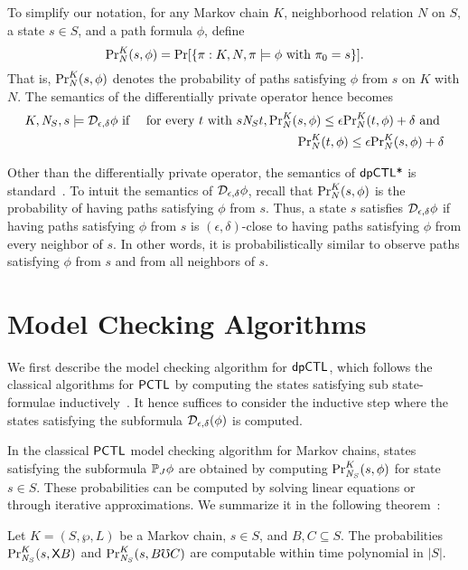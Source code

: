 To simplify our notation, for any Markov chain $K$, neighborhood
relation $N$ on $S$, a state $s \in S$, and a path formula $\phi$,
define
\[
\myPr{s}{K}{N}{\phi} =
\Pr [ \{ \pi : K, N, \pi \models \phi \textmd{ with } \pi_0 = s \} ].
\]
That is, $\myPr{s}{K}{N}{\phi}$ denotes the probability of paths
satisfying $\phi$ from $s$ on $K$ with $N$. The semantics of the
differentially private operator hence becomes
\begin{eqnarray*}
  K, \neighbor{S}, s \models \dpriv{\epsilon}{\delta} \phi
  & \textmd{ if } &
  \textmd{for every } t \textmd{ with }  s \neighbor{S} t,
      \myPr{s}{K}{N}{\phi} \leq \epsilon \myPr{t}{K}{N}{\phi} + \delta
      \textmd{ and }\\
  & &  \myPr{t}{K}{N}{\phi} \leq \epsilon \myPr{s}{K}{N}{\phi} + \delta
\end{eqnarray*}

Other than the differentially private operator, the semantics of
$\dpCTLstar$ is standard~\cite{BK:08:PMC}.
To intuit the semantics of $\dpriv{\epsilon}{\delta} \phi$,
recall that  $\myPr{s}{K}{N}{\phi}$ is the probability of having
paths satisfying $\phi$ from $s$. Thus, a state $s$ satisfies
$\dpriv{\epsilon}{\delta} \phi$ if having paths satisfying $\phi$
from $s$ is $(\epsilon, \delta)$-close to having paths satisfying
$\phi$ from every neighbor of $s$. In other words, it is
probabilistically similar to observe paths satisfying $\phi$ from $s$
and from all neighbors of $s$.

\section{Model Checking Algorithms}
We first describe the model checking algorithm for $\dpCTL$, which follows the classical
algorithms for $\PCTL$ by computing the states satisfying
sub state-formulae inductively~\cite{BK:08:PMC}. It hence suffices to
consider the inductive step where the states satisfying the subformula
$\dpriv{\epsilon}{\delta} (\phi)$ is computed.


In the classical $\PCTL$ model checking algorithm for Markov chains,
states satisfying the subformula $\PJ{J} \phi$ are obtained by
computing $\myPr{s}{K}{\neighbor{S}}{\phi}$ for state $s \in S$.
These probabilities can be computed by solving linear equations or
through iterative approximations. We summarize it in the following
theorem~\cite{BK:08:PMC}:

\begin{lemma}
  Let $K = (S, \wp, L)$ be a Markov chain, $s
  \in S$, and $B, C \subseteq S$. The probabilities
  $\myPr{s}{K}{\neighbor{S}}{\gX B}$ and
  $\myPr{s}{K}{\neighbor{S}}{B \mho C}$
\hide{
  $\Pr[\{ \pi : K, \neighbor{K}, \pi \models B \buntil{n} C \textmd{
    with } \pi_0 = s \}]$
} are computable within time polynomial in
  $|S|$.
  \label{lemma:PJ-subroutines}
\end{lemma}

